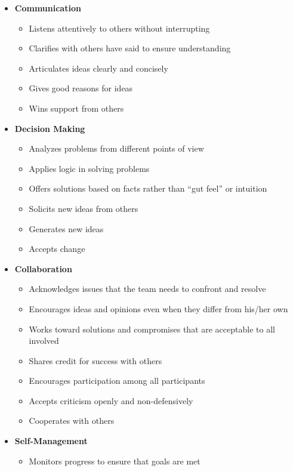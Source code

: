 \documentclass{report}
\begin{document}
\begin{table}
  \begin{itemize}
    \item \textbf{Communication}
      \begin{itemize}
      \item Listens attentively to others without interrupting
      \item Clarifies with others have said to ensure understanding
      \item Articulates ideas clearly and concisely
      \item Gives good reasons for ideas
      \item Wins support from others
      \end{itemize}
    \item \textbf{Decision Making}
      \begin{itemize}
      \item Analyzes problems from different points of view
      \item Applies logic in solving problems
      \item Offers solutions based on facts rather than ``gut feel'' or intuition
      \item Solicits new ideas from others
      \item Generates new ideas
      \item Accepts change
      \end{itemize}
    \item \textbf{Collaboration}
      \begin{itemize}
      \item Acknowledges issues that the team needs to confront and resolve
      \item Encourages ideas and opinions even when they differ from his/her own
      \item Works toward solutions and compromises that are acceptable to all involved
      \item Shares credit for success with others
      \item Encourages participation among all participants
      \item Accepts criticism openly and non-defensively
      \item Cooperates with others
      \end{itemize}
    \item \textbf{Self-Management}
      \begin{itemize}
      \item Monitors progress to ensure that goals are met

\end{itemize}
\end{itemize}
\end{table}
\end{document}

